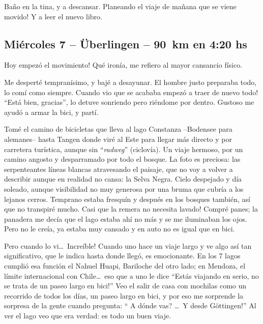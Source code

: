 Ba\~no en la tina, y a descansar. \textexclamdown Planeando el viaje de
ma\~nana que se viene movido! Y a leer el nuevo libro.

\subsection*{Mi\'ercoles 7 -- \"Uberlingen -- 90~km en 4:20 hs}

\textexclamdown Hoy empez\'o el movimiento! Qu\'e iron\'ia, me refiero al
mayor cansancio f\'isico.

Me despert\'e tempran\'isimo, y baj\'e a desayunar. El hombre justo preparaba
todo, lo com\'i como siempre. \textexclamdown Cuando vio que se acababa
empez\'o a traer de nuevo todo! ``Est\'a bien, gracias'', lo detuve sonriendo
pero ri\'endome por dentro. Gustoso me ayud\'o a armar la bici, y part\'i.

Tom\'e el camino de bicicletas que lleva al lago Constanza --Bodensee para
alemanes-- hasta Tangen donde vir\'e al Este para llegar m\'as directo y por
carretera tur\'istica, aunque sin ``\emph{radweg}'' (ciclov\'ia). Un viaje
hermoso, por un camino angosto y desparramado por todo el bosque. La
foto es preciosa: las serpenteantes l\'ineas blancas atravesando el paisaje,
que no voy a volver a describir aunque en realidad no cansa: la Selva Negra.
Cielo despejado y d\'ia soleado, aunque visibilidad no muy generosa por una
bruma que cubr\'ia a los lejanos cerros. Temprano estaba fresqu\'in y despu\'es
en los bosques tambi\'en, as\'i que no transpir\'e mucho. \textexclamdown Casi
que la remera no necesita lavado! Compr\'e panes; la panadera me dec\'ia que el
lago estaba ah\'i no m\'as y se me iluminaban los ojos. Pero no le cre\'ia, ya
estaba muy cansado y en auto no es igual que en bici.

Pero cuando lo vi\ldots\ \textexclamdown Incre\'ible! Cuando uno hace un viaje
largo y ve algo as\'i tan significativo, que le indica hasta donde lleg\'o,
es emocionante. En los 7 lagos cumpli\'o esa funci\'on el Nahuel Huapi,
Bariloche del otro lado; en Mendoza, el l\'imite internacional con
Chile\ldots\ eso que a uno le dice ``\textexclamdown Est\'as viajando en
serio, no se trata de un paseo largo en bici!'' Veo el salir de casa con
mochilas como un recorrido de todos los d\'ias, un paseo largo en bici, y por
eso me sorprende la sorpresa de la gente cuando pregunta: ``\textquestiondown
A d\'onde vas? \ldots\ \textexclamdown Y desde G\"ottingen!'' Al ver el lago
veo que era verdad: es todo un buen viaje.

